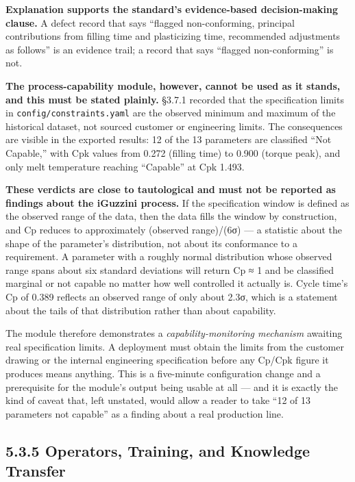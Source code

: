 \textbf{Explanation supports the standard's evidence-based decision-making clause.} A defect record that says ``flagged non-conforming, principal contributions from filling time and plasticizing time, recommended adjustments as follows'' is an evidence trail; a record that says ``flagged non-conforming'' is not.

\textbf{The process-capability module, however, cannot be used as it stands, and this must be stated plainly.} §3.7.1 recorded that the specification limits in \texttt{config/constraints.yaml} are the observed minimum and maximum of the historical dataset, not sourced customer or engineering limits. The consequences are visible in the exported results: 12 of the 13 parameters are classified ``Not Capable,'' with Cpk values from 0.272 (filling time) to 0.900 (torque peak), and only melt temperature reaching ``Capable'' at Cpk 1.493.

\textbf{These verdicts are close to tautological and must not be reported as findings about the iGuzzini process.} If the specification window is defined as the observed range of the data, then the data fills the window by construction, and Cp reduces to approximately (observed range)/(6σ) --- a statistic about the shape of the parameter's distribution, not about its conformance to a requirement. A parameter with a roughly normal distribution whose observed range spans about six standard deviations will return Cp ≈ 1 and be classified marginal or not capable no matter how well controlled it actually is. Cycle time's Cp of 0.389 reflects an observed range of only about 2.3σ, which is a statement about the tails of that distribution rather than about capability.

The module therefore demonstrates a \emph{capability-monitoring mechanism} awaiting real specification limits. A deployment must obtain the limits from the customer drawing or the internal engineering specification before any Cp/Cpk figure it produces means anything. This is a five-minute configuration change and a prerequisite for the module's output being usable at all --- and it is exactly the kind of caveat that, left unstated, would allow a reader to take ``12 of 13 parameters not capable'' as a finding about a real production line.

\hypertarget{operators-training-and-knowledge-transfer}{%
\subsection{5.3.5 Operators, Training, and Knowledge Transfer}\label{operators-training-and-knowledge-transfer}}

